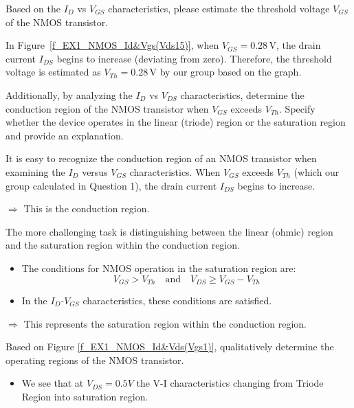 \begin{question}
	\item Based on the $I_D$ vs $V_{GS}$ characteristics, please estimate the threshold voltage $V_{GS}$ of the NMOS transistor. 
	
	\begin{answer}
		In Figure~\ref{f_EX1_NMOS_Id&Vgs(Vds15)}, when \( V_{GS} = 0.28\,\mathrm{V} \), the drain current \( I_{DS} \) begins to increase (deviating from zero). Therefore, the threshold voltage is estimated as \( V_{Th} = 0.28\,\mathrm{V} \) by our group based on the graph.
	\end{answer}
	
	\item Additionally, by analyzing the $I_{D}$ vs $V_{DS}$ characteristics, determine the conduction region of the NMOS transistor when $V_{GS}$ exceeds $V_{Th}$. Specify whether the device operates in the linear (triode) region or the saturation region and provide an explanation.
	
	\begin{answer}
		It is easy to recognize the conduction region of an NMOS transistor when examining the $I_{D}$ versus $V_{GS}$ characteristics. When $V_{GS}$ exceeds $V_{Th}$ (which our group calculated in Question 1), the drain current $I_{DS}$ begins to increase.
		
		$\Rightarrow$ This is the conduction region.
		 		
		The more challenging task is distinguishing between the linear (ohmic) region and the saturation region within the conduction region.
		
		\begin{itemize}[label=-]
			\item The conditions for NMOS operation in the saturation region are:
			\[ 
			V_{GS} > V_{Th} \quad \text{and} \quad V_{DS} \geq V_{GS} - V_{Th}
			\]
			
			\item In the $I_{D}$-$V_{GS}$ characteristics, these conditions are satisfied.
		\end{itemize}
		
		$\Rightarrow$ This represents the saturation region within the conduction region.
	\end{answer}
	
	\item Based on Figure \ref{f_EX1_NMOS_Id&Vds(Vgs1)}, qualitatively determine the operating regions of the NMOS transistor.
	
	\begin{answer}
		\begin{itemize}[label=-]
			\item We see that at $V_{DS} = 0.5V$ the V-I characteristics changing from Triode Region into saturation region.
			

\end{itemize}
\end{answer}
\end{question}
